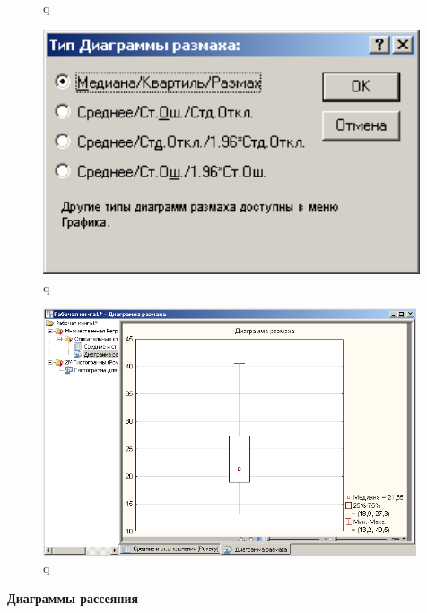 \begin{figure}[!h]
\begin{minipage}{0.32\textwidth}
    \caption{q}
    \label{fig:example_11}
  \end{minipage}
  \begin{minipage}{0.32\textwidth}
    \centering

    \includegraphics[width=0.99\textwidth]
    {inc/example_12.PNG}

    \caption{q}
    \label{fig:example_12}
  \end{minipage}
\end{figure}

\begin{figure}[!h]
  \centering

  \includegraphics[width=11cm]
  {inc/example_13.PNG}

  \caption{q}

  \label{fig:example_13}
\end{figure}

\newpage

\begin{center}
  \textbf{Диаграммы рассеяния}
\end{center}

